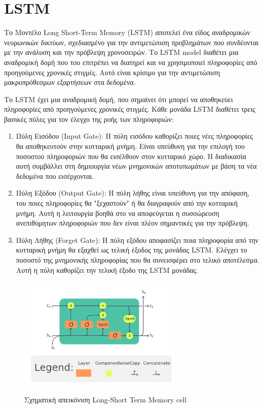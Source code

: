 \section{LSTM}
\label{section:lstm}
Το Μοντέλο Long Short-Term Memory (LSTM) αποτελεί ένα είδος αναδρομικών νευρωνικών δικτύων, σχεδιασμένο για την αντιμετώπιση προβλημάτων που συνδέονται με την ανάλυση και την πρόβλεψη χρονοσειρών. Το LSTM model διαθέτει μια αναδρομική δομή που του επιτρέπει να διατηρεί και να χρησιμοποιεί πληροφορίες από προηγούμενες χρονικές στιγμές. Αυτό είναι κρίσιμο για την αντιμετώπιση μακροπρόθεσμων εξαρτήσεων στα δεδομένα. 

Το LSTM έχει μια αναδρομική δομή, που σημαίνει ότι μπορεί να αποθηκεύει πληροφορίες από προηγούμενες χρονικές στιγμές. Κάθε μονάδα LSTM διαθέτει τρεις βασικές πύλες για τον έλεγχο της ροής των πληροφοριών:

\begin{enumerate}
    \item Πύλη Εισόδου (Input Gate): Η πύλη εισόδου καθορίζει ποιες νέες πληροφορίες θα αποθηκευτούν στην κυτταρική μνήμη. Είναι υπεύθυνη για την επιλογή του ποσοστού πληροφοριών που θα εισέλθουν στον κυτταρικό χώρο. Η διαδικασία αυτή συμβάλλει στη δημιουργία νέων μνημονικών αποτυπωμάτων με βάση τα νέα δεδομένα που εισέρχονται.
    \item Πύλη Εξόδου (Output Gate): Η πύλη λήθης είναι υπεύθυνη για την απόφαση, του ποιες πληροφορίες θα "ξεχαστούν" ή θα διαγραφούν από την κυτταρική μνήμη. Αυτή η λειτουργία βοηθά στο να αποφεύγεται η συσσώρευση ανεπιθύμητων πληροφοριών που δεν είναι πλέον σημαντικές για την πρόβλεψη.
    \item Πύλη Λήθης (Forget Gate): Η πύλη εξόδου αποφασίζει ποια πληροφορία από την κυτταρική μνήμη θα εξαχθεί ως τελική έξοδος της μονάδας LSTM. Ελέγχει το ποσοστό της μνημονικής πληροφορίας που θα συνεισφέρει στο τελικό αποτέλεσμα. Αυτή η πύλη καθορίζει την τελική έξοδο της LSTM μονάδας.
\end{enumerate}

\begin{figure}[!ht]
	\centering
	\includegraphics[width=0.7\textwidth]{./images/chapter2/LSTM_Cell.png}
	\caption[Σχηματική απεικόνιση Long-Short Term Memory cell]{Σχηματική απεικόνιση Long-Short Term Memory cell} \cite{pictlstm}
	\label{fig:LSTM_Cell}
\end{figure}

